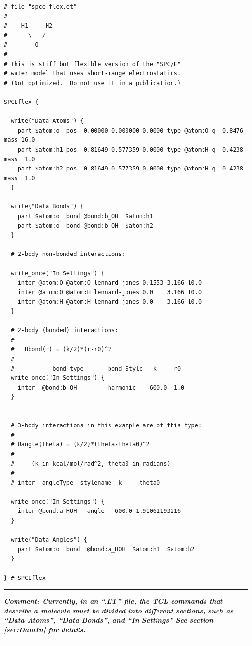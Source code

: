 \documentclass[11pt]{article}
\begin{document}
\begin{verbatim}
# file "spce_flex.et"
#
#    H1     H2
#      \   /
#        O
#
# This is stiff but flexible version of the "SPC/E" 
# water model that uses short-range electrostatics.
# (Not optimized.  Do not use it in a publication.)

SPCEflex {

  write("Data Atoms") {
    part $atom:o  pos  0.00000 0.000000 0.0000 type @atom:O q -0.8476 mass 16.0 
    part $atom:h1 pos  0.81649 0.577359 0.0000 type @atom:H q  0.4238 mass  1.0
    part $atom:h2 pos -0.81649 0.577359 0.0000 type @atom:H q  0.4238 mass  1.0
  }

  write("Data Bonds") {
    part $atom:o  bond @bond:b_OH  $atom:h1
    part $atom:o  bond @bond:b_OH  $atom:h2
  }

  # 2-body non-bonded interactions:

  write_once("In Settings") {
    inter @atom:O @atom:O lennard-jones 0.1553 3.166 10.0
    inter @atom:O @atom:H lennard-jones 0.0    3.166 10.0
    inter @atom:H @atom:H lennard-jones 0.0    3.166 10.0
  }

  # 2-body (bonded) interactions:
  #
  #   Ubond(r) = (k/2)*(r-r0)^2
  #
  #           bond_type       bond_Style   k     r0
  write_once("In Settings") {
    inter  @bond:b_OH         harmonic    600.0  1.0
  }

  
  # 3-body interactions in this example are of this type:
  #
  # Uangle(theta) = (k/2)*(theta-theta0)^2   
  #
  #     (k in kcal/mol/rad^2, theta0 in radians)
  #
  # inter  angleType  stylename  k     theta0

  write_once("In Settings") {
    inter @bond:a_HOH   angle   600.0 1.91061193216
  }

  write("Data Angles") {
    part $atom:o  bond  @bond:a_HOH  $atom:h1  $atom:h2
  }

} # SPCEflex
\end{verbatim}

\rule{10cm}{0.4mm}

\textit{\textbf{Comment: Currently, in an ``.ET'' file, the TCL commands that describe a molecule must be divided into different sections, such as ``Data Atoms'', ``Data Bonds'', and ``In Settings''  See section \ref{sec:DataIn} for details.}}

\rule{10cm}{0.4mm}
\end{document}
